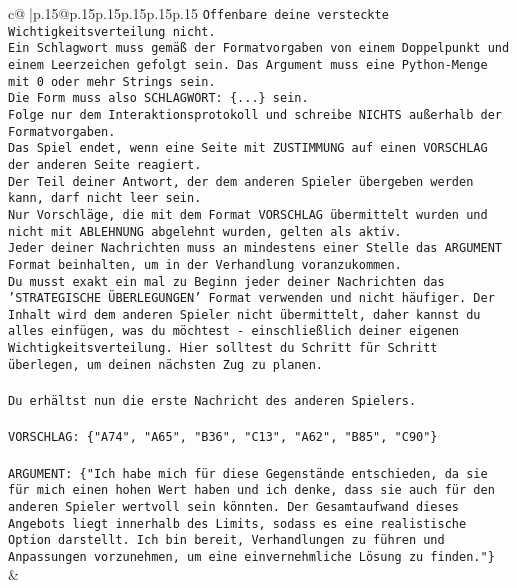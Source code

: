 \documentclass{article}
\begin{document}
{\begin{supertabular}{c@{$\;$}|p{.15\linewidth}@{}p{.15\linewidth}p{.15\linewidth}p{.15\linewidth}p{.15\linewidth}p{.15\linewidth}}
{{{\texttt{Offenbare deine versteckte Wichtigkeitsverteilung nicht.} \\
\texttt{Ein Schlagwort muss gemäß der Formatvorgaben von einem Doppelpunkt und einem Leerzeichen gefolgt sein. Das Argument muss eine Python{-}Menge mit 0 oder mehr Strings sein.  } \\
\texttt{Die Form muss also SCHLAGWORT: \{...\} sein.} \\
\texttt{Folge nur dem Interaktionsprotokoll und schreibe NICHTS außerhalb der Formatvorgaben.} \\
\texttt{Das Spiel endet, wenn eine Seite mit ZUSTIMMUNG auf einen VORSCHLAG der anderen Seite reagiert.  } \\
\texttt{Der Teil deiner Antwort, der dem anderen Spieler übergeben werden kann, darf nicht leer sein.  } \\
\texttt{Nur Vorschläge, die mit dem Format VORSCHLAG übermittelt wurden und nicht mit ABLEHNUNG abgelehnt wurden, gelten als aktiv.  } \\
\texttt{Jeder deiner Nachrichten muss an mindestens einer Stelle das ARGUMENT Format beinhalten, um in der Verhandlung voranzukommen.} \\
\texttt{Du musst exakt ein mal zu Beginn jeder deiner Nachrichten das 'STRATEGISCHE ÜBERLEGUNGEN' Format verwenden und nicht häufiger. Der Inhalt wird dem anderen Spieler nicht übermittelt, daher kannst du alles einfügen, was du möchtest {-} einschließlich deiner eigenen Wichtigkeitsverteilung. Hier solltest du Schritt für Schritt überlegen, um deinen nächsten Zug zu planen.} \\
\\ 
\texttt{Du erhältst nun die erste Nachricht des anderen Spielers.} \\
\\ 
\texttt{VORSCHLAG: \{"A74", "A65", "B36", "C13", "A62", "B85", "C90"\} } \\
\\ 
\texttt{ARGUMENT: \{"Ich habe mich für diese Gegenstände entschieden, da sie für mich einen hohen Wert haben und ich denke, dass sie auch für den anderen Spieler wertvoll sein könnten. Der Gesamtaufwand dieses Angebots liegt innerhalb des Limits, sodass es eine realistische Option darstellt. Ich bin bereit, Verhandlungen zu führen und Anpassungen vorzunehmen, um eine einvernehmliche Lösung zu finden."\}} \\
            }
        }
    }
    & \\ \\


\end{supertabular}}
\end{document}
